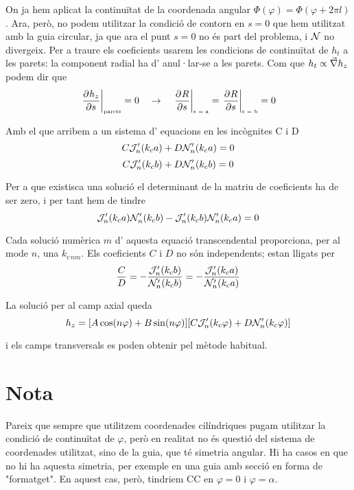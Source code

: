 On ja hem aplicat la continuïtat de la coordenada angular $\Phi(\varphi) = \Phi(\varphi + 2\pi l)$. Ara, però, no podem utilitzar la condició de contorn en $s = 0$ que hem utilitzat amb la guia circular, ja que ara el punt $s = 0$ no és part del problema, i $\mathcal N$ no divergeix. Per a traure els coeficients usarem les condicions de continuïtat de $h_t$ a les parets: la component radial ha d' anul·lar-se a les parets. Com que $h_t \propto \vec \nabla h_z$ podem dir que
\begin{equation}
   \left. \frac{\partial ^{} h_z}{\partial s ^{}} \right \vert _{\text{\tiny parets}} = 0 \quad \to \quad \left. \frac{\partial ^{} R}{\partial s ^{}} \right \vert _{\text{\tiny s = a}} = \left. \frac{\partial ^{} R}{\partial s ^{}} \right \vert _{\text{\tiny s = b}} = 0
\end{equation}

Amb el que arribem a un sistema d' equacions en les incògnites C i D
\begin{equation}
  C\mathcal J _n ' (k_c a) + D \mathcal N _ n ' (k_c a) = 0
\end{equation}
\begin{equation}
  C\mathcal J _n ' (k_c b) + D \mathcal N _ n ' (k_c b) = 0
\end{equation}

Per a que existisca una solució el determinant de la matriu de coeficients ha de ser zero, i per tant hem de tindre
\begin{equation}
  \mathcal J _n ' (k_c a) \mathcal N _n ' (k_c b ) - \mathcal J _n ' (k_c b) \mathcal N _n ' (k_c a) = 0
\end{equation}

Cada solució numèrica $m$ d' aquesta equació transcendental proporciona, per al mode $n$, una $k_{c\,nm}$. Els coeficients $C$ i $D$ no són independents; estan lligats per
\begin{equation}
  \frac{C}{D} = -\frac{\mathcal J _n ' (k_c b )}{\mathcal N _n ' (k_c b )} = -\frac{\mathcal J _n ' (k_c a )}{\mathcal N _n ' (k_c a )}
\end{equation}

La solució per al camp axial queda
\begin{equation}
  h_z = [A \cos (n \varphi) + B \sin (n \varphi) ][C \mathcal J _n ' (k_c \varphi) + D \mathcal N _n ' (k_c \varphi)]
\end{equation}

i els camps transversals es poden obtenir pel mètode habitual.


\section*{Nota}

Pareix que sempre que utilitzem coordenades cilíndriques pugam utilitzar la condició de continuïtat de $\varphi$, però en realitat no és questió del sistema de coordenades utilitzat, sino de la guia, que té simetria angular. Hi ha casos en que no hi ha aquesta simetria, per exemple en una guia amb secció en forma de "formatget". En aquest cas, però, tindriem CC en $\varphi=0$ i $\varphi = \alpha$.